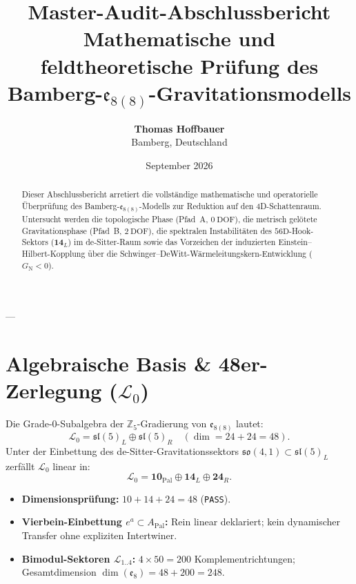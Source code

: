 \documentclass[11pt,a4paper]{article}
\title{\textbf{Master-Audit-Abschlussbericht}\\\Large Mathematische und feldtheoretische Prüfung des Bamberg-$\mathfrak{e}_{8(8)}$-Gravitationsmodells}
\author{\textbf{Thomas Hoffbauer} \\ \small Bamberg, Deutschland}
\date{September 2026}
\begin{document}
\maketitle

\begin{abstract}
Dieser Abschlussbericht arretiert die vollständige mathematische und operatorielle Überprüfung des Bamberg-$\mathfrak{e}_{8(8)}$-Modells zur Reduktion auf den 4D-Schattenraum. Untersucht werden die topologische Phase (Pfad~A, $0\ \text{DOF}$), die metrisch gelötete Gravitationsphase (Pfad~B, $2\ \text{DOF}$), die spektralen Instabilitäten des $56\text{D}$-Hook-Sektors ($\mathbf{14}_L$) im de-Sitter-Raum sowie das Vorzeichen der induzierten Einstein--Hilbert-Kopplung über die Schwinger--DeWitt-Wärmeleitungskern-Entwicklung ($G_{\mathrm{N}} < 0$).
\end{abstract}

\vspace{0.5em}

---

\section{Algebraische Basis \& 48er-Zerlegung ($\mathcal{L}_0$)}

Die Grade-0-Subalgebra der $\mathbb{Z}_5$-Gradierung von $\mathfrak{e}_{8(8)}$ lautet:
\begin{equation}
\mathcal{L}_0 = \mathfrak{sl}(5)_L \oplus \mathfrak{sl}(5)_R \quad (\dim = 24 + 24 = 48).
\end{equation}
Unter der Einbettung des de-Sitter-Gravitationssektors $\mathfrak{so}(4,1) \subset \mathfrak{sl}(5)_L$ zerfällt $\mathcal{L}_0$ linear in:
\begin{equation}
\mathcal{L}_0 = \mathbf{10}_{\mathrm{Pal}} \oplus \mathbf{14}_L \oplus \mathbf{24}_R.
\end{equation}

\begin{itemize}
    \item \textbf{Dimensionsprüfung:} $10 + 14 + 24 = 48$ (\texttt{PASS}).
    \item \textbf{Vierbein-Einbettung $e^a \subset A_{\mathrm{Pal}}$:} Rein linear deklariert; kein dynamischer Transfer ohne expliziten Intertwiner.
    \item \textbf{Bimodul-Sektoren $\mathcal{L}_{1..4}$:} $4 \times 50 = 200$ Komplementrichtungen; Gesamtdimension $\dim(\mathfrak{e}_8) = 48 + 200 = 248$.
\end{itemize}
\end{document}
